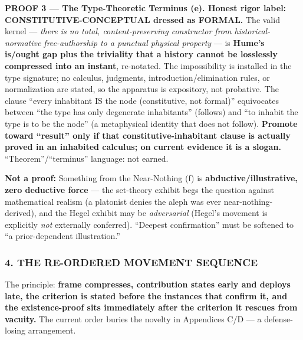 \documentclass[11pt]{article}
\begin{document}
\textbf{PROOF 3 — The Type-Theoretic Terminus (e). Honest rigor label: CONSTITUTIVE-CONCEPTUAL dressed as FORMAL.} The valid kernel — \emph{there is no total, content-preserving constructor from historical-normative free-authorship to a punctual physical property} — is \textbf{Hume's is/\allowbreak{}ought gap plus the triviality that a history cannot be losslessly compressed into an instant}, re-notated. The impossibility is installed in the type signature; no calculus, judgments, introduction/\allowbreak{}elimination rules, or normalization are stated, so the apparatus is expository, not probative. The clause ``every inhabitant IS the node (constitutive, not formal)'' equivocates between ``the type has only degenerate inhabitants'' (follows) and ``to inhabit the type is to be the node'' (a metaphysical identity that does not follow). \textbf{Promote toward ``result'' only if that constitutive-inhabitant clause is actually proved in an inhabited calculus; on current evidence it is a slogan.} ``Theorem''/\allowbreak{}``terminus'' language: not earned.

\textbf{Not a proof:} Something from the Near-Nothing (f) is \textbf{abductive/\allowbreak{}illustrative, zero deductive force} — the set-theory exhibit begs the question against mathematical realism (a platonist denies the aleph was ever near-nothing-derived), and the Hegel exhibit may be \emph{adversarial} (Hegel's movement is explicitly \emph{not} externally conferred). ``Deepest confirmation'' must be softened to ``a prior-dependent illustration.''

\subsubsection*{4. THE RE-ORDERED MOVEMENT SEQUENCE}

The principle: \textbf{frame compresses, contribution states early and deploys late, the criterion is stated before the instances that confirm it, and the existence-proof sits immediately after the criterion it rescues from vacuity.} The current order buries the novelty in Appendices C/\allowbreak{}D — a defense-losing arrangement.
\end{document}
